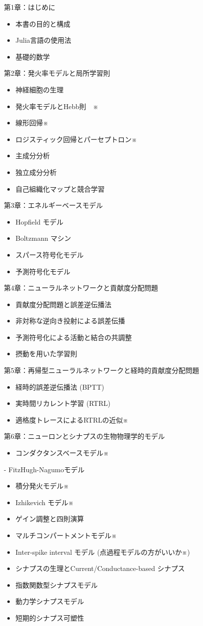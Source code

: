 第1章：はじめに
\begin{itemize}
\item 本書の目的と構成
\item Julia言語の使用法
\item 基礎的数学
\end{itemize}
第2章：発火率モデルと局所学習則
\begin{itemize}
\item 神経細胞の生理
\item 発火率モデルとHebb則　※
\item 線形回帰※
\item ロジスティック回帰とパーセプトロン※
\item 主成分分析
\item 独立成分分析
\item 自己組織化マップと競合学習
\end{itemize}
第3章：エネルギーベースモデル
\begin{itemize}
\item Hopfield モデル
\item Boltzmann マシン
\item スパース符号化モデル
\item 予測符号化モデル
\end{itemize}
第4章：ニューラルネットワークと貢献度分配問題
\begin{itemize}
\item 貢献度分配問題と誤差逆伝播法
\item 非対称な逆向き投射による誤差伝播
\item 予測符号化による活動と結合の共調整
\item 摂動を用いた学習則
\end{itemize}
第5章：再帰型ニューラルネットワークと経時的貢献度分配問題
\begin{itemize}
\item 経時的誤差逆伝播法 (BPTT)
\item 実時間リカレント学習 (RTRL)
\item 適格度トレースによるRTRLの近似※
\end{itemize}
第6章：ニューロンとシナプスの生物物理学的モデル
\begin{itemize}
\item コンダクタンスベースモデル※
\end{itemize}
  - FitzHugh-Nagumoモデル
\begin{itemize}
\item 積分発火モデル※
\item Izhikevich モデル※
\item ゲイン調整と四則演算
\item マルチコンパートメントモデル※
\item Inter-spike interval モデル (点過程モデルの方がいいか※)
\item シナプスの生理とCurrent/Conductance-based シナプス
\item 指数関数型シナプスモデル
\item 動力学シナプスモデル
\item 短期的シナプス可塑性
\end{itemize}
